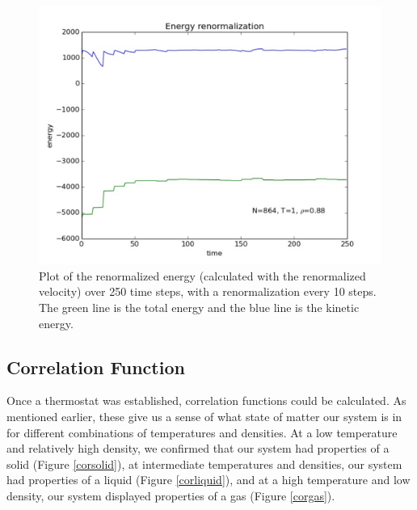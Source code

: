 \documentclass{article}
\begin{document}
\begin{multicols}{2}
\begin{figure}[H]
\begin{center}
\includegraphics[width=\linewidth]{plots/renormalizationshorttimerange.pdf}
\caption{Plot of the renormalized energy (calculated with the renormalized velocity) over 250 time steps, with a renormalization every 10 steps.  The green line is the total energy and the blue line is the kinetic energy.}
\label{engrenorm}
\end{center}
\end{figure}

\subsection{Correlation Function}

Once a thermostat was established, correlation functions could be calculated.  As mentioned earlier, these give us a sense of what state of matter our system is in for different combinations of temperatures and densities.  At a low temperature and relatively high density, we confirmed that our system had properties of a solid (Figure \ref{corsolid}), at intermediate temperatures and densities, our system had properties of a liquid (Figure \ref{corliquid}), and at a high temperature and low density, our system displayed properties of a gas (Figure \ref{corgas}).  


\end{multicols}
\end{document}

